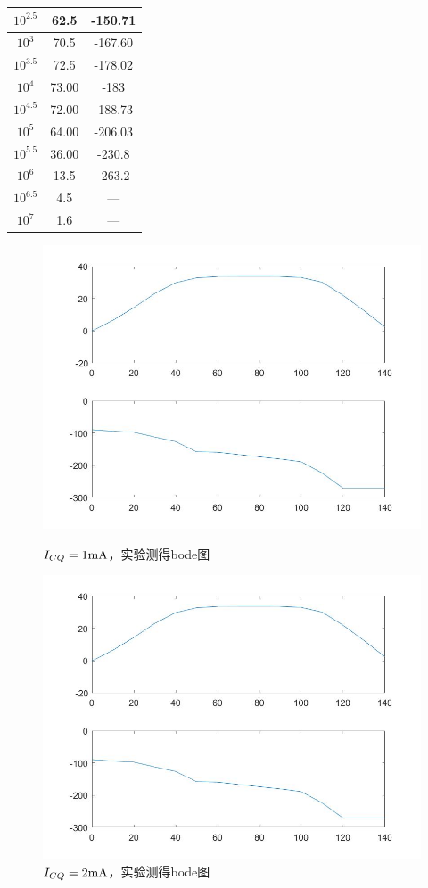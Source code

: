\documentclass[UTF8,a4paper]{ctexart}
\begin{document}
\begin{table}
\begin{multicols}{2}
\begin{tabular}{|c|c|c|}
\hline
$10^{2.5}$&62.5&-150.71\\
\hline
$10^{3}$&70.5&-167.60\\
\hline
$10^{3.5}$&72.5&-178.02\\
\hline
$10^{4}$&73.00&-183\\
\hline
$10^{4.5}$&72.00&-188.73\\
\hline
$10^{5}$&64.00&-206.03\\
\hline
$10^{5.5}$&36.00&-230.8\\
\hline
$10^{6}$&13.5&-263.2\\
\hline
$10^{6.5}$&4.5&---\\
\hline
$10^{7}$&1.6&---\\
\hline
\end{tabular}
\end{multicols}
\end{table}
\begin{figure}
\centering
\includegraphics[width=\textwidth]{bode1exp.jpg}
\caption{$I_{CQ}=1\rm{mA}$，实验测得bode图}
\label{bode1exp}
\includegraphics[width=\textwidth]{bode1exp.jpg}
\caption{$I_{CQ}=2\rm{mA}$，实验测得bode图}
\label{bode2exp}
\end{figure}
\end{document}
